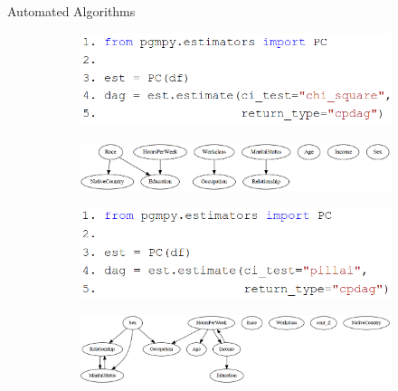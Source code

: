 \documentclass{beamer}
\begin{document}
\begin{frame}{Automated Algorithms}
	\begin{figure}
		\begin{subfigure}{0.5\textwidth}
			\centering
			\includegraphics[scale=0.2]{imgs/pc_chisquare.png}
		\end{subfigure}
		\begin{subfigure}{0.5 \textwidth}
			\centering
			\includegraphics[scale=0.2]{imgs/adult_x2.png}
		\end{subfigure}
	\end{figure}
	\begin{figure}
		\begin{subfigure}{0.5 \textwidth}
			\centering
			\includegraphics[scale=0.2]{imgs/pc_pillai.png}
		\end{subfigure}
		\begin{subfigure}{0.5 \textwidth}
			\centering
			\includegraphics[scale=0.2]{imgs/adult_pillai.png}
		\end{subfigure}
	\end{figure}
\end{frame}
\end{document}
